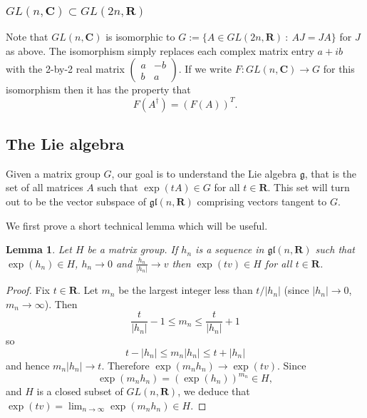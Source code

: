 \documentclass[12pt]{article}
\newcommand{\CC}{\mathbf{C}}
\newcommand{\RR}{\mathbf{R}}
\newcommand{\matr}[4]{\left(\begin{array}{cc}#1 & #2\\ #3 & #4\end{array}\right)}
\newtheorem{lma}[thm]{Lemma}
\theoremstyle{definition}
\theoremstyle{check}
\theoremstyle{remark}
\theoremstyle{TheoremNum}
\begin{document}
\subsubsection{$GL(n,\CC)\subset GL(2n,\RR)$}

Note that $GL(n,\CC)$ is isomorphic to $G:=\{A\in GL(2n,\RR)\ :\ AJ=JA\}$ for $J$ as above. The isomorphism simply replaces each complex matrix entry $a+ib$ with the 2-by-2 real matrix $\matr{a}{-b}{b}{a}$. If we write $F\colon GL(n,\CC)\to G$ for this isomorphism then it has the property that
\[F(A^{\dagger})=(F(A))^T.\]


\subsection{The Lie algebra}

Given a matrix group $G$, our goal is to understand the Lie algebra $\mathfrak{g}$, that is the set of all matrices $A$ such that $\exp(tA)\in G$ for all $t\in\RR$. This set will turn out to be the vector subspace of $\mathfrak{gl}(n,\RR)$ comprising vectors tangent to $G$.

We first prove a short technical lemma which will be useful.

\begin{lma}\label{lma:adams}
Let $H$ be a matrix group. If $h_n$ is a sequence in $\mathfrak{gl}(n,\RR)$ such that $\exp(h_n)\in H$,  $h_n\to 0$ and $\frac{h_n}{|h_n|}\to v$ then $\exp(tv)\in H$ for all $t\in\RR$.
\end{lma}
\begin{proof}
Fix $t\in\RR$. Let $m_n$ be the largest integer less than $t/|h_n|$ (since $|h_n|\to 0$, $m_n\to\infty$). Then
\[\frac{t}{|h_n|}-1\leq m_n\leq \frac{t}{|h_n|}+1\]
so
\[t-|h_n|\leq m_n|h_n|\leq t+|h_n|\]
and hence $m_n|h_n|\to t$. Therefore $\exp(m_nh_n)\to\exp(tv)$. Since
\[\exp(m_nh_n)=(\exp(h_n))^{m_n}\in H,\]
and $H$ is a closed subset of $GL(n,\RR)$, we deduce that $\exp(tv)=\lim_{n\to\infty}\exp(m_nh_n)\in H$.
\end{proof}
\end{document}
